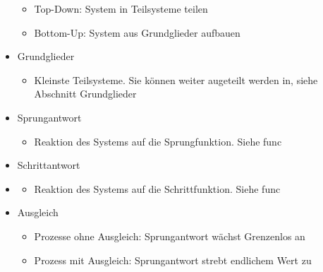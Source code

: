 \documentclass[margin=normal]{tex/hsrzf}
\begin{document}
\begin{itemize}
\begin{itemize}
                  \item Top-Down: System in Teilsysteme teilen
                  \item Bottom-Up: System aus Grundglieder aufbauen
            \end{itemize}
      \item Grundglieder
            \begin{itemize}
                  \item Kleinste Teilsysteme. Sie können weiter augeteilt werden in, siehe Abschnitt Grundglieder
            \end{itemize}
      \item Sprungantwort
            \begin{itemize}
                  \item Reaktion des Systems auf die Sprungfunktion. Siehe \refname{func}

            \end{itemize}
      \item Schrittantwort
      \item \begin{itemize}
                  \item Reaktion des Systems auf die Schrittfunktion. Siehe \refname{func}
            \end{itemize}
      \item Ausgleich
            \begin{itemize}
                  \item Prozesse ohne Ausgleich: Sprungantwort wächst Grenzenlos an
                  \item Prozess mit Ausgleich: Sprungantwort strebt endlichem Wert zu
            \end{itemize}

\end{itemize}
\end{document}
